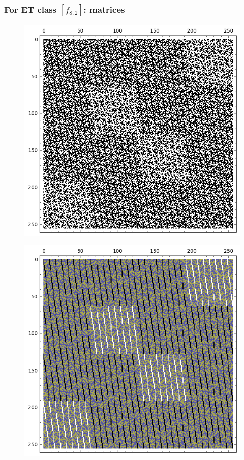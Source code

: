 \documentclass[pdf,sprung,slideColor,nocolorBG]{beamer}
\newenvironment{colortheme}[1]{
\def\ProvidesPackageRCS $##1${\relax}
\renewcommand{\ProcessOptions}{\relax}
\makeatletter

\makeatother
}{}
\begin{document}
\begin{colortheme}{jubata}
\begin{frame}
\begin{figure}
\begin{minipage}{.48\textwidth}
  \label{fig:8_1_bent_cayley_graph_index_matrix}
\end{minipage}
\end{figure}
~
\end{frame}
\begin{frame}
\frametitle{For ET class $[f_{8,2}]$: matrices}
\begin{figure}
\centering
\begin{minipage}{.48\textwidth}
  \centering
  \includegraphics[width=.9\linewidth]{../matrix_plot/c8_2_weight_class_matrix.png}
  \label{fig:8_2_weight_class_matrix}
\end{minipage}%
\begin{minipage}{.48\textwidth}
  \centering
  \includegraphics[width=.9\linewidth]{../matrix_plot/c8_2_bent_cayley_graph_index_matrix.png}

\end{minipage}
\end{figure}
\end{frame}
\end{colortheme}
\end{document}
